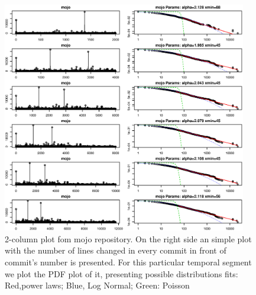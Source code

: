\documentclass[conference]{IEEEtran}
\begin{document}
     
\begin{figure}[htbp]
  \centerline{\includegraphics[width=0.95\textwidth]{img/mojo_global_estimation.eps}}
  \caption{2-column plot fom mojo repository. On the right side an
    simple plot with the number of lines changed in every commit in
    front of commit's number is presented. For this particular
    temporal segment we plot the PDF plot of it, presenting possible
    distributions fits: Red,power laws; Blue, Log Normal; Green:
    Poisson}
  \label{fig:mojo}
\end{figure}
\end{document}
